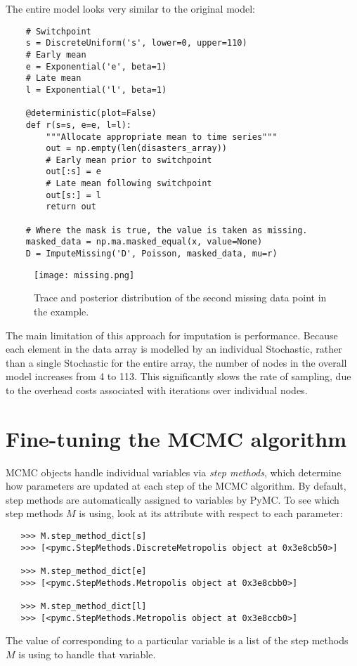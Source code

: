 The entire model looks very similar to the original model:

\begin{verbatim}
	# Switchpoint
	s = DiscreteUniform('s', lower=0, upper=110)
	# Early mean
	e = Exponential('e', beta=1)
	# Late mean
	l = Exponential('l', beta=1)

	@deterministic(plot=False)
	def r(s=s, e=e, l=l):
	    """Allocate appropriate mean to time series"""
	    out = np.empty(len(disasters_array))
	    # Early mean prior to switchpoint
	    out[:s] = e
	    # Late mean following switchpoint
	    out[s:] = l
	    return out

	# Where the mask is true, the value is taken as missing.
	masked_data = np.ma.masked_equal(x, value=None)
	D = ImputeMissing('D', Poisson, masked_data, mu=r)
\end{verbatim}

\begin{figure}[ht]
\begin{center}
\texttt{[image: missing.png]}
\caption{Trace and posterior distribution of the second missing data point in the example.}
\label{fig:missing}
\end{center}
\end{figure}


The main limitation of this approach for imputation is performance. Because each
element in the data array is modelled by an individual Stochastic, rather than a
single Stochastic for the entire array, the number of nodes in the overall model
increases from 4 to 113. This significantly slows the rate of sampling, due to
the overhead costs associated with iterations over individual nodes. 



\section{Fine-tuning the MCMC algorithm}

MCMC objects handle individual variables via \emph{step methods}, which determine how parameters are updated at each step of the MCMC algorithm. By default, step methods are automatically assigned to variables by PyMC. To see which step methods $M$ is using, look at its  attribute with respect to each parameter:
\begin{verbatim}
   >>> M.step_method_dict[s]
   >>> [<pymc.StepMethods.DiscreteMetropolis object at 0x3e8cb50>]

   >>> M.step_method_dict[e]
   >>> [<pymc.StepMethods.Metropolis object at 0x3e8cbb0>]

   >>> M.step_method_dict[l]
   >>> [<pymc.StepMethods.Metropolis object at 0x3e8ccb0>]
\end{verbatim}
The value of  corresponding to a particular variable is a list of the step methods $M$ is using to handle that variable.

